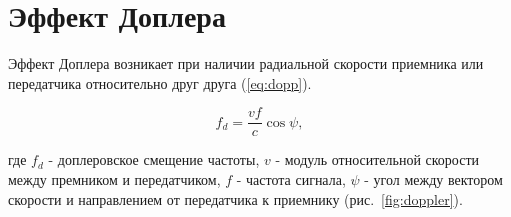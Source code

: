 %
%
%
%



\section{Эффект Доплера}

Эффект Доплера возникает при наличии радиальной
скорости приемника или передатчика относительно друг друга (\ref{eq:dopp}). 

\begin{equation}
    f_d = \frac{v f}{c} \cos \psi ,
    \label{eq:dopp}
\end{equation}

\noindent где $f_d$ - доплеровское смещение частоты, $v$ - модуль относительной скорости между
премником и передатчиком, $f$ - частота сигнала, $\psi$ - угол между вектором скорости и
направлением от передатчика к приемнику  (рис.~\ref{fig:doppler}).

